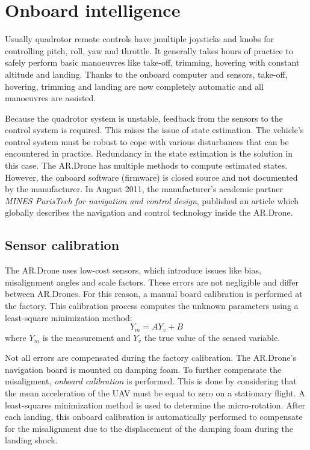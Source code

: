 \section{Onboard intelligence}
\label{sec:platform_onboard_intelligence}
Usually quadrotor remote controls have jmultiple joysticks and knobs for controlling pitch, roll, yaw and throttle.
It generally takes hours of practice to safely perform basic manoeuvres like take-off, trimming, hovering with constant altitude and landing.
Thanks to the onboard computer and sensors, take-off, hovering, trimming and landing are now completely automatic and all manoeuvres are assisted.

Because the quadrotor system is unstable, feedback from the sensors to the control system is required.
This raises the issue of state estimation.
The vehicle's control system must be robust to cope with various disturbances that can be encountered in practice.
Redundancy in the state estimation is the solution in this case.
The AR.Drone has multiple methods to compute estimated states.
However, the onboard software (firmware) is closed source and not documented by the manufacturer.
In August 2011, the manufacturer's academic partner \textit{MINES ParisTech for navigation and control design}, published an article \cite{bristeau2011navigation} which globally describes the navigation and control technology inside the AR.Drone.



\subsection{Sensor calibration}
The AR.Drone uses low-cost sensors, which introduce issues like bias, misalignment angles and scale factors.
These errors are not negligible and differ between AR.Drones.
For this reason, a manual board calibration is performed at the factory.
This calibration process computes the unknown parameters using a least-square minimization method:
\begin{equation}
Y_m = AY_v + B
\end{equation}
where $Y_m$ is the measurement and $Y_v$ the true value of the sensed variable.

Not all errors are compensated during the factory calibration.
The AR.Drone's navigation board is mounted on damping foam.
To further compensate the misaligment, \textit{onboard calibration} is performed.
This is done by considering that the mean acceleration of the UAV must be equal to zero on a stationary flight.
A least-squares minimization method is used to determine the micro-rotation.
After each landing, this onboard calibration is automatically performed to compensate for the misalignment due to the displacement of the damping foam during the landing shock.

